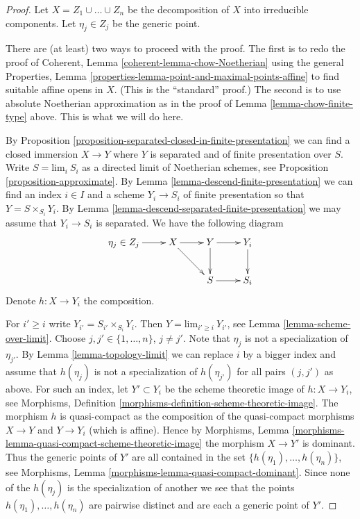\begin{proof}
Let $X = Z_1 \cup \ldots \cup Z_n$ be the decomposition of $X$
into irreducible components. Let $\eta_j \in Z_j$ be the generic point.

\medskip\noindent
There are (at least) two ways to proceed with the proof.
The first is to redo the proof of
Coherent, Lemma \ref{coherent-lemma-chow-Noetherian}
using the general
Properties, Lemma \ref{properties-lemma-point-and-maximal-points-affine}
to find suitable affine opens in $X$. (This is the ``standard'' proof.)
The second is to use absolute Noetherian approximation as in
the proof of Lemma \ref{lemma-chow-finite-type} above.
This is what we will do here.

\medskip\noindent
By Proposition \ref{proposition-separated-closed-in-finite-presentation}
we can find a closed immersion $X \to Y$ where $Y$ is separated
and of finite presentation over $S$.
Write $S = \text{lim}_i\ S_i$ as a directed limit of Noetherian schemes, see
Proposition \ref{proposition-approximate}. By
Lemma \ref{lemma-descend-finite-presentation} we can
find an index $i \in I$ and a scheme $Y_i \to S_i$ of finite presentation
so that $Y = S \times_{S_i} Y_i$.
By Lemma \ref{lemma-descend-separated-finite-presentation}
we may assume that $Y_i \to S_i$ is separated.
We have the following diagram
$$
\xymatrix{
\eta_j \in Z_j \ar[r] & X \ar[r] \ar[rd] & Y \ar[r] \ar[d] & Y_i \ar[d] \\
& & S \ar[r] & S_i
}
$$
Denote $h : X \to Y_i$ the composition.

\medskip\noindent
For $i' \geq i$ write $Y_{i'} = S_{i'} \times_{S_i} Y_i$.
Then $Y = \text{lim}_{i' \geq i}\ Y_{i'}$, see
Lemma \ref{lemma-scheme-over-limit}.
Choose $j, j' \in \{1, \ldots, n\}$, $j \not = j'$.
Note that $\eta_j$ is not a specialization of $\eta_{j'}$.
By Lemma \ref{lemma-topology-limit}
we can replace $i$ by a bigger index and assume
that $h(\eta_j)$ is not a specialization of $h(\eta_{j'})$
for all pairs $(j, j')$ as above.
For such an index, let
$Y' \subset Y_i$ be the scheme theoretic image of
$h : X \to Y_i$, see
Morphisms, Definition \ref{morphisms-definition-scheme-theoretic-image}.
The morphism $h$ is quasi-compact as the composition of the quasi-compact
morphisms $X \to Y$ and $Y \to Y_i$ (which is affine).
Hence by
Morphisms, Lemma \ref{morphisms-lemma-quasi-compact-scheme-theoretic-image}
the morphism $X \to Y'$ is dominant. Thus the generic points
of $Y'$ are all contained in the set
$\{h(\eta_1), \ldots, h(\eta_n)\}$, see
Morphisms, Lemma \ref{morphisms-lemma-quasi-compact-dominant}.
Since none of the $h(\eta_j)$ is the specialization of another
we see that the points $h(\eta_1), \ldots, h(\eta_n)$ are pairwise
distinct and are each a generic point of $Y'$.


\end{proof}
